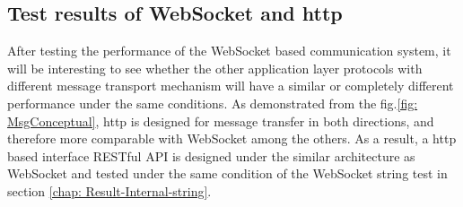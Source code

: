 \subsection{Test results of WebSocket and \gls{http}} \label{chap: Result-RestFUL_WS}
After testing the performance of the WebSocket based communication system, 
it will be interesting to see whether the other application layer protocols with 
different message transport mechanism will have a similar or completely different 
performance under the same conditions. As demonstrated from the 
fig.\ref{fig: MsgConceptual}, \gls{http} is designed for message 
transfer in both directions, and therefore more comparable with WebSocket among the others. 
As a result, a \gls{http} based interface RESTful API is designed under the similar architecture 
as WebSocket and tested under the same condition of the WebSocket string test in 
section \ref{chap: Result-Internal-string}.




